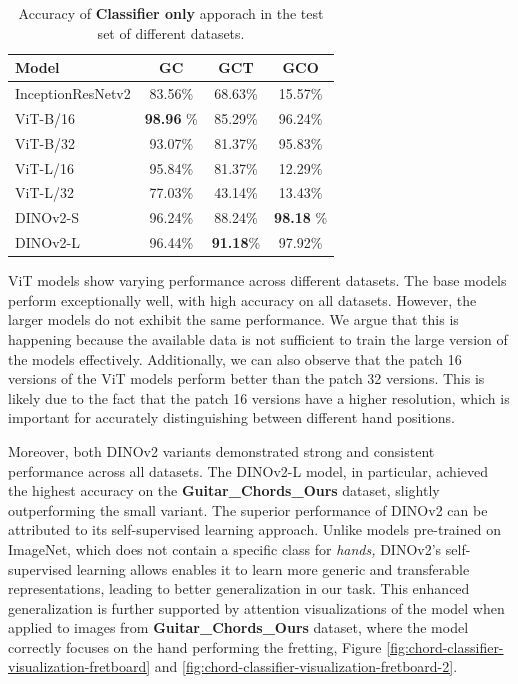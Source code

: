 \documentclass[10pt,twocolumn,letterpaper]{article}
\begin{document}
\begin{table}[h]
    \centering
    \begin{tabular}{lccc}
        \toprule
        \textbf{Model}    & \textbf{GC}       & \textbf{GCT}     & \textbf{GCO}      \\
        \midrule
        InceptionResNetv2 & 83.56\%           & 68.63\%          & 15.57\%           \\
        \midrule
        ViT-B/16          & \textbf{98.96} \% & 85.29\%          & 96.24\%           \\
        ViT-B/32          & 93.07\%           & 81.37\%          & 95.83\%           \\
        ViT-L/16          & 95.84\%           & 81.37\%          & 12.29\%           \\
        ViT-L/32          & 77.03\%           & 43.14\%          & 13.43\%           \\
        DINOv2-S          & 96.24\%           & 88.24\%          & \textbf{98.18} \% \\
        DINOv2-L          & 96.44\%           & \textbf{91.18}\% & 97.92\%           \\
        \bottomrule
    \end{tabular}
    \caption{Accuracy of \textbf{Classifier only} apporach in the test set of different datasets.}
    \label{tab:transformer-models-results}
\end{table}

ViT models show varying performance across different datasets. The base models perform exceptionally well, with high accuracy on all datasets. However, the larger models do not exhibit the same performance. We argue that this is happening because the available data is not sufficient to train the large version of the models effectively. Additionally, we can also observe that the patch 16 versions of the ViT models perform better than the patch 32 versions. This is likely due to the fact that the patch 16 versions have a higher resolution, which is important for accurately distinguishing between different hand positions.

Moreover, both DINOv2 variants demonstrated strong and consistent performance across all datasets. The DINOv2-L model, in particular, achieved the highest accuracy on the \textbf{Guitar\_Chords\_Ours} dataset, slightly outperforming the small variant. The superior performance of DINOv2 can be attributed to its self-supervised learning approach. Unlike models pre-trained on ImageNet, which does not contain a specific class for \emph{hands,} DINOv2's self-supervised learning allows enables it to learn more generic and transferable representations, leading to better generalization in our task. This enhanced generalization is further supported by attention visualizations of the model when applied to images from \textbf{Guitar\_Chords\_Ours} dataset, where the model correctly focuses on the hand performing the fretting, Figure \ref{fig:chord-classifier-visualization-fretboard} and \ref{fig:chord-classifier-visualization-fretboard-2}.
\end{document}
